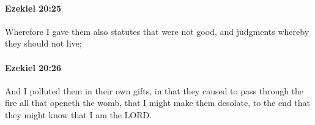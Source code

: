 		\paragraph{Ezekiel 20:25} %
			\label{EZEKIEL-20-25}

			Wherefore I gave them also statutes that were not good, and judgments whereby they should not live;


		\paragraph{Ezekiel 20:26} %
			\label{EZEKIEL-20-26}

			And I polluted them in their own gifts, in that they caused to pass through the fire all that openeth the womb, that I might make them desolate, to the end that they might know that I am the LORD.


